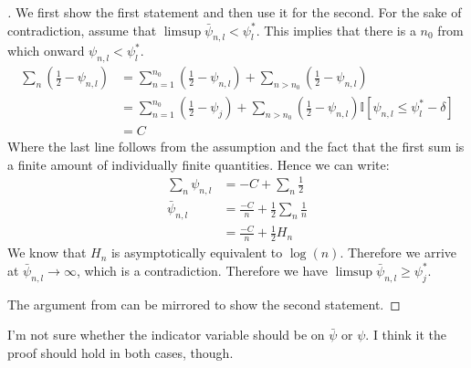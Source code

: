 \begin{proof}[]
    We first show the first statement and then use it for the second. For the
    sake of contradiction, assume that $\limsup \bar{\psi}_{n, l} <
    \psi_l^*$. This implies that there is a $n_0$ from which onward $\psi_{n,
    l} < \psi_l^*$.
    \begin{align}
      \sum_n (\frac{1}{2} - \psi_{n, l}) &= \sum_{n=1}^{n_0} (\frac{1}{2} -
          \psi_{n, l}) + \sum_{n > n_0} (\frac{1}{2} - \psi_{n, l}) \\
        &= \sum_{n=1}^{n_0} (\frac{1}{2} - \psi_j) + \sum_{n > n_0}
            (\frac{1}{2} - \psi_{n, l})\mathbb{I}[\psi_{n, l} \leq \psi_l^* -
            \delta] \\
        &= C
    \end{align}
    Where the last line follows from the assumption and the fact that the first
    sum is a finite amount of individually finite quantities. Hence we can
    write:
    \begin{align}
      \sum_n \psi_{n, l} &= -C + \sum_n \frac{1}{2} \\
      \bar{\psi}_{n, l} &= \frac{-C}{n} + \frac{1}{2}\sum_n\frac{1}{n} \\
        &= \frac{-C}{n} + \frac{1}{2} H_n
    \end{align}
    We know that $H_n$ is asymptotically equivalent to $\log(n)$. Therefore we
    arrive at $\bar{\psi}_{n, l} \rightarrow \infty$, which is a contradiction.
    Therefore we have $\limsup \bar{\psi}_{n, l} \geq \psi_j^*$.

    The argument from  can be
    mirrored to show the second statement.
  \end{proof}

  \begin{remark}[Kevin 19/10/29]
    I'm not sure whether the indicator variable should be on $\bar{\psi}$ or
    $\psi$. I think it the proof should hold in both cases, though.
  \end{remark}

